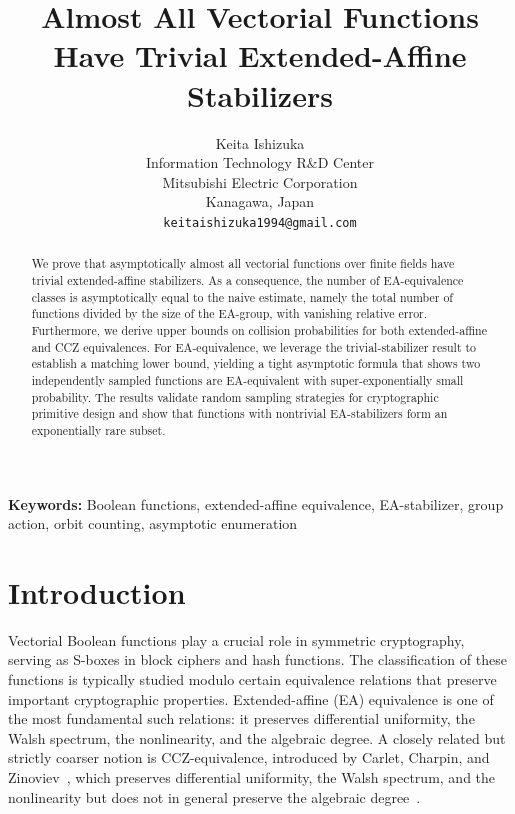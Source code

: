 \documentclass[11pt]{article}
\title{Almost All Vectorial Functions Have Trivial Extended-Affine Stabilizers}
\author{Keita Ishizuka\\
Information Technology R\&D Center\\
Mitsubishi Electric Corporation\\
Kanagawa, Japan\\
\texttt{keitaishizuka1994@gmail.com}}
\date{}
\theoremstyle{definition}
\begin{document}
\maketitle

\begin{abstract}
We prove that asymptotically almost all vectorial functions over finite fields have trivial extended-affine stabilizers. As a consequence, the number of EA-equivalence classes is asymptotically equal to the naive estimate, namely the total number of functions divided by the size of the EA-group, with vanishing relative error.
Furthermore, we derive upper bounds on collision probabilities for both extended-affine and CCZ equivalences. For EA-equivalence, we leverage the trivial-stabilizer result to establish a matching lower bound, yielding a tight asymptotic formula that shows two independently sampled functions are EA-equivalent with super-exponentially small probability.
The results validate random sampling strategies for cryptographic primitive design and show that functions with nontrivial EA-stabilizers form an exponentially rare subset.
\end{abstract}

\noindent\textbf{Keywords:} Boolean functions, extended-affine equivalence, EA-stabilizer, group action, orbit counting, asymptotic enumeration

\section{Introduction}

Vectorial Boolean functions play a crucial role in symmetric
cryptography, serving as S-boxes in block ciphers and hash functions. The classification
of these functions is typically studied modulo certain equivalence relations that preserve
important cryptographic properties. Extended-affine (EA) equivalence is one of the most
fundamental such relations: it preserves differential uniformity, the Walsh spectrum, the
nonlinearity, and the algebraic degree. A closely related but strictly coarser notion is
CCZ-equivalence, introduced by Carlet, Charpin, and Zinoviev~\cite{carlet1998}, which
preserves differential uniformity, the Walsh spectrum, and the nonlinearity but does not
in general preserve the algebraic degree~\cite{budaghyan2020}.
\end{document}
